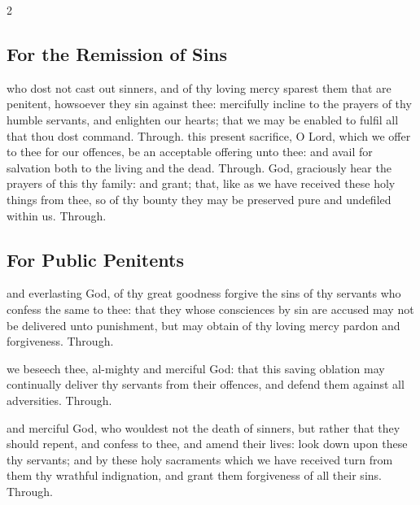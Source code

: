 \begin{multicols}{2}
   \newcolumn

\subsection{For the Remission of Sins}
\collect
{} who dost not cast out sinners, and of thy loving mercy sparest them that are penitent, howsoever they sin against thee: mercifully incline to the prayers of thy humble servants, and enlighten our hearts; that we may be enabled to fulfil all that thou dost command. Through.
\secret
{} this present sacrifice, O Lord, which we offer to thee for our offences, be an acceptable offering unto thee: and avail for salvation both to the living and the dead. Through.
\postcommunion
{} God, graciously hear the prayers of this thy family: and grant; that, like as we have received these holy things from thee, so of thy bounty they may be preserved pure and undefiled within us. Through.

\subsection{For Public Penitents}
\collect
{} and everlasting God, of thy great goodness forgive the sins of thy servants who confess the same to thee: that they whose consciences by sin are accused may not be delivered unto punishment, but may obtain of thy loving mercy pardon and forgiveness. Through.

\vspace{-0.25\baselineskip}

\secret

\vspace{-0.1\baselineskip}

 we beseech thee, al-mighty and merciful God: that this saving oblation may continually deliver thy servants from their offences, and defend them against all adversities. Through.

\vspace{-0.25\baselineskip}

\postcommunion

\vspace{-0.1\baselineskip}

 and merciful God, who wouldest not the death of sinners, but rather that they should repent, and confess to thee, and amend their lives: look down upon these thy servants; and by these holy sacraments which we have received turn from them thy wrathful indignation, and grant them forgiveness of all their sins. Through.


\end{multicols}
